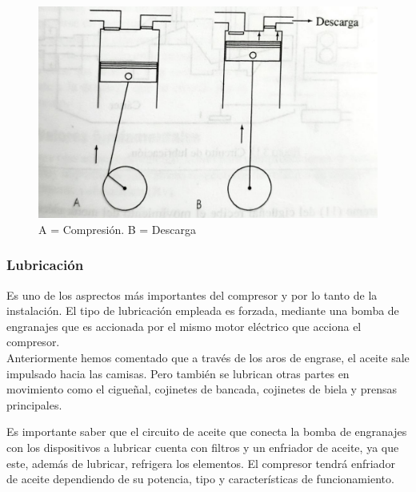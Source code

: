 \begin{figure}[H]
	\centering
	\includegraphics[width=.5\linewidth]{figuras/compresores/aspiracion y descarga.jpg}
	\caption{A = Compresi\'on. B = Descarga}
	\label{fig:Carrera ascendente}
\end{figure}
\subsubsection{Lubricación}
Es uno de los asprectos m\'as importantes del compresor y por lo tanto de la instalaci\'on. El tipo de lubricaci\'on empleada es forzada, mediante una bomba de engranajes que es accionada por el mismo motor el\'ectrico que acciona el compresor.\\ Anteriormente hemos comentado que a trav\'es de los aros de engrase, el aceite sale impulsado hacia las camisas. Pero tambi\'en se lubrican otras partes en movimiento como el cigueñal, cojinetes de bancada, cojinetes de biela y prensas principales.

Es importante saber que el circuito de aceite que conecta la bomba de engranajes con los dispositivos a lubricar cuenta con filtros y un enfriador de aceite, ya que este, adem\'as de lubricar, refrigera los elementos. El compresor tendr\'a enfriador de aceite dependiendo de su potencia, tipo y caracter\'isticas de funcionamiento.
